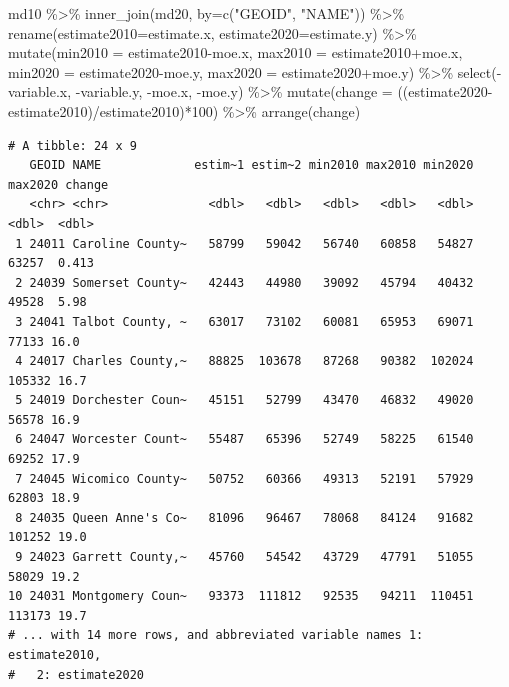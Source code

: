 \documentclass[
  letterpaper,
  DIV=11,
  numbers=noendperiod]{scrreprt}
\newenvironment{Shaded}{\begin{snugshade}}{\end{snugshade}}
\newcommand{\AttributeTok}[1]{\textcolor[rgb]{0.40,0.45,0.13}{#1}}
\newcommand{\DecValTok}[1]{\textcolor[rgb]{0.68,0.00,0.00}{#1}}
\newcommand{\FunctionTok}[1]{\textcolor[rgb]{0.28,0.35,0.67}{#1}}
\newcommand{\NormalTok}[1]{\textcolor[rgb]{0.00,0.23,0.31}{#1}}
\newcommand{\SpecialCharTok}[1]{\textcolor[rgb]{0.37,0.37,0.37}{#1}}
\newcommand{\StringTok}[1]{\textcolor[rgb]{0.13,0.47,0.30}{#1}}
\begin{document}
\begin{Shaded}
\begin{Highlighting}[]
\NormalTok{md10 }\SpecialCharTok{\%\textgreater{}\%}
  \FunctionTok{inner\_join}\NormalTok{(md20, }\AttributeTok{by=}\FunctionTok{c}\NormalTok{(}\StringTok{"GEOID"}\NormalTok{, }\StringTok{"NAME"}\NormalTok{)) }\SpecialCharTok{\%\textgreater{}\%}
  \FunctionTok{rename}\NormalTok{(}\AttributeTok{estimate2010=}\NormalTok{estimate.x, }\AttributeTok{estimate2020=}\NormalTok{estimate.y) }\SpecialCharTok{\%\textgreater{}\%}
  \FunctionTok{mutate}\NormalTok{(}\AttributeTok{min2010 =}\NormalTok{ estimate2010}\SpecialCharTok{{-}}\NormalTok{moe.x, }\AttributeTok{max2010 =}\NormalTok{ estimate2010}\SpecialCharTok{+}\NormalTok{moe.x, }\AttributeTok{min2020 =}\NormalTok{ estimate2020}\SpecialCharTok{{-}}\NormalTok{moe.y, }\AttributeTok{max2020 =}\NormalTok{ estimate2020}\SpecialCharTok{+}\NormalTok{moe.y) }\SpecialCharTok{\%\textgreater{}\%}
  \FunctionTok{select}\NormalTok{(}\SpecialCharTok{{-}}\NormalTok{variable.x, }\SpecialCharTok{{-}}\NormalTok{variable.y, }\SpecialCharTok{{-}}\NormalTok{moe.x, }\SpecialCharTok{{-}}\NormalTok{moe.y) }\SpecialCharTok{\%\textgreater{}\%}
  \FunctionTok{mutate}\NormalTok{(}\AttributeTok{change =}\NormalTok{ ((estimate2020}\SpecialCharTok{{-}}\NormalTok{estimate2010)}\SpecialCharTok{/}\NormalTok{estimate2010)}\SpecialCharTok{*}\DecValTok{100}\NormalTok{) }\SpecialCharTok{\%\textgreater{}\%}
  \FunctionTok{arrange}\NormalTok{(change)}
\end{Highlighting}
\end{Shaded}

\begin{verbatim}
# A tibble: 24 x 9
   GEOID NAME             estim~1 estim~2 min2010 max2010 min2020 max2020 change
   <chr> <chr>              <dbl>   <dbl>   <dbl>   <dbl>   <dbl>   <dbl>  <dbl>
 1 24011 Caroline County~   58799   59042   56740   60858   54827   63257  0.413
 2 24039 Somerset County~   42443   44980   39092   45794   40432   49528  5.98 
 3 24041 Talbot County, ~   63017   73102   60081   65953   69071   77133 16.0  
 4 24017 Charles County,~   88825  103678   87268   90382  102024  105332 16.7  
 5 24019 Dorchester Coun~   45151   52799   43470   46832   49020   56578 16.9  
 6 24047 Worcester Count~   55487   65396   52749   58225   61540   69252 17.9  
 7 24045 Wicomico County~   50752   60366   49313   52191   57929   62803 18.9  
 8 24035 Queen Anne's Co~   81096   96467   78068   84124   91682  101252 19.0  
 9 24023 Garrett County,~   45760   54542   43729   47791   51055   58029 19.2  
10 24031 Montgomery Coun~   93373  111812   92535   94211  110451  113173 19.7  
# ... with 14 more rows, and abbreviated variable names 1: estimate2010,
#   2: estimate2020
\end{verbatim}
\end{document}
